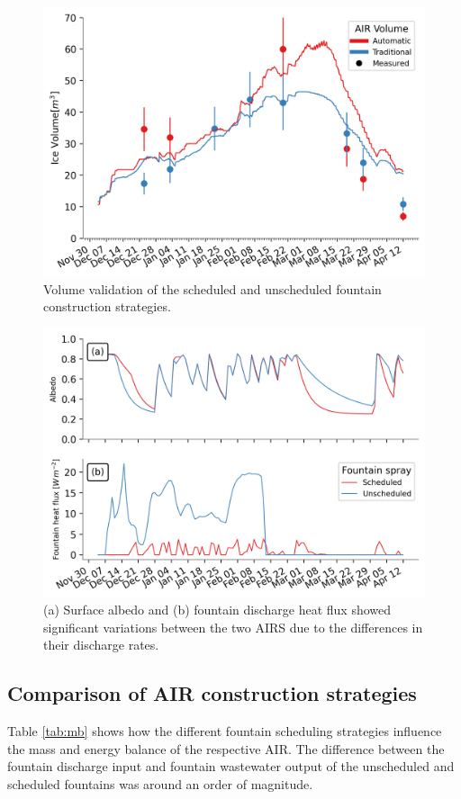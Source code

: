 \documentclass[tc, manuscript]{copernicus}
\begin{document}
\begin{figure}[t] \includegraphics[width=12cm] {Figures/validation.png} \caption{Volume validation of the
scheduled and unscheduled fountain construction strategies.} \label{fig:validation} \end{figure}

\begin{figure}[t]
\includegraphics[width=12cm]{Figures/dis_processes.png}
\caption{(a) Surface albedo  and (b) fountain discharge heat flux showed significant variations between the two
  AIRS due to the differences in their discharge rates.}
\label{fig:dis_processes}
\end{figure}

\subsection{Comparison of AIR construction strategies}


Table \ref{tab:mb} shows how the different fountain scheduling strategies influence the mass and energy balance
of the respective AIR. The difference between the fountain discharge input and fountain wastewater output of the
unscheduled and scheduled fountains was around an order of magnitude. 
\end{document}
